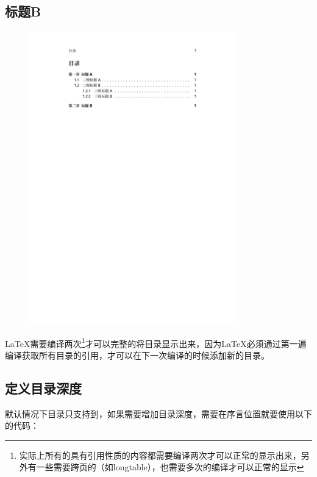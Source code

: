 \begin{texsepcode}
\begin{texcodenoshad}
            \section{标题B}
        \end{texcodenoshad}
        \tcblower
        \begin{figure}[H]
            \centering
            \includegraphics[page=1,clip,trim =0 {0.7\paperheight} 0 {0.1\paperheight},width=0.8\textwidth]{fig/section-tmp.pdf}
        \end{figure}
    \end{texsepcode}
    \LaTeX{}需要编译两次\footnote{实际上所有的具有引用性质的内容都需要编译两次才可以正常的显示出来，另外有一些需要跨页的（如longtable），也需要多次的编译才可以正常的显示}才可以完整的将目录显示出来，因为\LaTeX{}必须通过第一遍编译获取所有目录的引用，才可以在下一次编译的时候添加新的目录。

    \subsection{定义目录深度}
    默认情况下目录只支持到，如果需要增加目录深度，需要在序言位置就要使用以下的代码：
    
